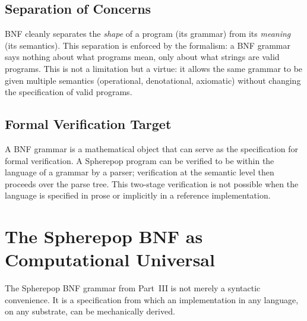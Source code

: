 \documentclass[12pt, a4paper, openany]{book}
\theoremstyle{plain}
\theoremstyle{definition}
\theoremstyle{remark}
\begin{document}
\subsection{Separation of Concerns}

BNF cleanly separates the \emph{shape} of a program (its grammar) from its
\emph{meaning} (its semantics). This separation is enforced by the formalism:
a BNF grammar says nothing about what programs mean, only about what strings
are valid programs. This is not a limitation but a virtue: it allows the same
grammar to be given multiple semantics (operational, denotational, axiomatic)
without changing the specification of valid programs.

\subsection{Formal Verification Target}

A BNF grammar is a mathematical object that can serve as the specification for
formal verification. A Spherepop program can be verified to be within the language
of a grammar by a parser; verification at the semantic level then proceeds over
the parse tree. This two-stage verification is not possible when the language is
specified in prose or implicitly in a reference implementation.

\section{The Spherepop BNF as Computational Universal}

The Spherepop BNF grammar from Part~III is not merely a syntactic convenience.
It is a specification from which an implementation in any language, on any
substrate, can be mechanically derived.
\end{document}
